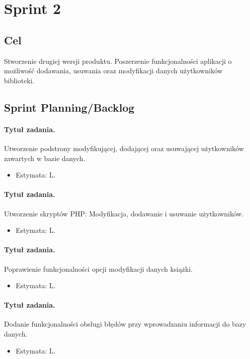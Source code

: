 \documentclass[a4paper]{article}
\begin{document}
\section{Sprint 2}

\subsection{Cel} Stworzenie drugiej wersji produktu. Poszerzenie funkcjonalności aplikacji o możliwość dodawania, usuwania oraz modyfikacji danych użytkowników biblioteki.

\subsection{Sprint Planning/Backlog}

\paragraph{Tytuł zadania.} Utworzenie podstrony modyfikującej, dodającej oraz usuwającej użytkowników zawartych w bazie danych.
\begin{itemize}
\item Estymata: L.
\end{itemize}

\paragraph{Tytuł zadania.} Utworzenie skryptów PHP: Modyfikacja, dodawanie i usuwanie użytkowników.
\begin{itemize}
\item Estymata: L.
\end{itemize}

\paragraph{Tytuł zadania.} Poprawienie funkcjonalności opcji modyfikacji danych książki.
\begin{itemize}
\item Estymata: L.
\end{itemize}

\paragraph{Tytuł zadania.} Dodanie funkcjonalności obsługi błędów przy wprowadzaniu informacji do bazy danych.
\begin{itemize}
\item Estymata: L.
\end{itemize}
\end{document}
